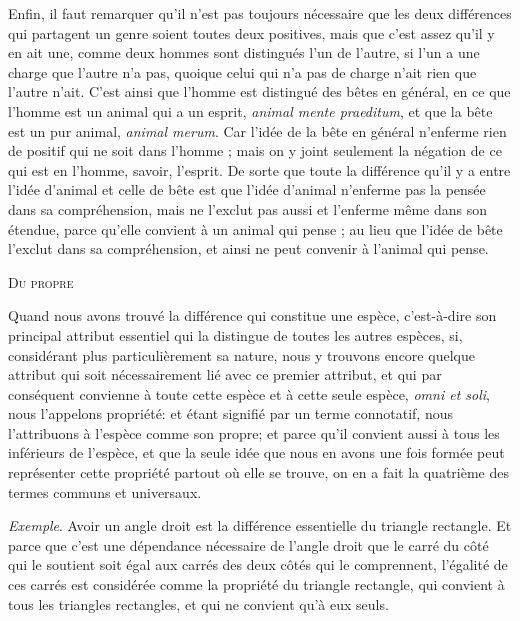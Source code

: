 Enfin, il faut remarquer qu'il n'est pas toujours nécessaire que les deux différences qui partagent un genre soient toutes deux positives, mais que c'est assez qu'il y en ait une, comme deux hommes sont distingués l'un de l'autre, si l'un a une charge que l'autre n'a pas, quoique celui qui n'a pas de charge n'ait rien que l'autre n'ait. C'est ainsi que l'homme est distingué des bêtes en général, en ce que l'homme est un animal qui a un esprit, \emph{animal mente praeditum}, et que la bête est un pur animal, \emph{animal merum}. Car l'idée de la bête en général n'enferme rien de positif qui ne soit dans l'homme ; mais on y joint seulement la négation de ce qui est en l'homme, savoir, l'esprit. De sorte que toute la différence qu'il y a entre l'idée d'animal et celle de bête est que l'idée d'animal n'enferme pas la pensée dans sa compréhension, mais ne l'exclut pas aussi et l'enferme même dans son étendue, parce qu'elle convient à un animal qui pense ; au lieu que l'idée de bête l'exclut dans sa compréhension, et ainsi ne peut convenir à l'animal qui pense.

\bigbreak
\bigbreak
\bigbreak

\begin{center}{\large\scshape Du propre}\end{center}

Quand nous avons trouvé la différence qui constitue une espèce, c'est-à-dire son principal attribut essentiel qui la distingue de toutes les autres espèces, si, considérant plus particulièrement sa nature, nous y trouvons encore quelque attribut qui soit nécessairement lié avec ce premier attribut, et qui par conséquent convienne à toute cette espèce et à cette seule espèce, \emph{omni et soli}, nous l'appelons propriété: et étant signifié par un terme connotatif, nous l'attribuons à l'espèce comme son propre; et parce qu'il convient aussi à tous les inférieurs de l'espèce, et que la seule idée que nous en avons une fois formée peut représenter cette propriété partout où elle se trouve, on en a fait la quatrième des termes communs et universaux.

\emph{Exemple}. Avoir un angle droit est la différence essentielle du triangle rectangle. Et parce que c'est une dépendance nécessaire de l'angle droit que le carré du côté qui le soutient soit égal aux carrés des deux côtés qui le comprennent, l'égalité de ces carrés est considérée comme la propriété du triangle rectangle, qui convient à tous les triangles rectangles, et qui ne convient qu'à eux seuls.

